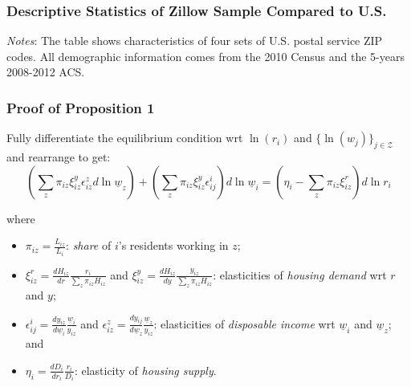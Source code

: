 

\begin{frame}[label = tab_comparison]
	\frametitle{Descriptive Statistics of Zillow Sample Compared to U.S.}
	
	\begin{table}[h!] \centering
		\resizebox{.72\textwidth}{!}{
			
		}
		\begin{minipage}{0.95\textwidth} \scriptsize \vspace{1mm}
			\textit{Notes}: The table shows characteristics of four sets of U.S. postal 
			service ZIP codes. All demographic information comes from the 2010 Census and 
			the 5-years 2008-2012 ACS.
		\end{minipage}
	\end{table}
	
	\hyperlink{zipcodes_map}{}
\end{frame}

\begin{frame}[label = proof_prop_1]
	\frametitle{Proof of Proposition 1}
	
	Fully differentiate the equilibrium condition wrt $\ln \left(r_i\right)$ and $
	\{\ln \left(w_j\right)\}_{j \in \mathcal{Z}}$ and rearrange to get:
	$$
	\left( \sum_z \pi_{i z} \xi_{i z}^y \epsilon_{i z}^z d \ln \underline{w}_z \right)
	+ \left( \sum_z \pi_{i z} \xi_{i z}^y \epsilon_{i j}^i \right) d \ln \underline{w}_i
	= \left(\eta_i - \sum_z \pi_{i z} \xi_{i z}^r \right) d \ln r_i
	$$
	
	where 
	\begin{itemize} \small
		\item $\pi_{iz} = \frac{L_{i z}}{L_i}$: \textit{share} of $i$'s residents 
		working in $z$;
		
		\item $\xi_{iz}^r = \frac{d H_{i z}}{d r} \frac{r_i}{\sum_z \pi_{i z}H_{i z}}$ 
		and $\xi_{iz}^y = \frac{d H_{i z}}{d y} \frac{y_{i z}}{\sum_z \pi_{i z}H_{i z}}$: 
		elasticities of \textit{housing demand} wrt $r$ and $y$;
		
		\item $\epsilon_{ij}^i = \frac{d y_{i z}}{d \underline{w}_i} 
		\frac{\underline{w}_i}{y_{i z}}$ and $\epsilon_{i z}^z = \frac{d y_{i j}}{d 
			\underline{w}_z} \frac{\underline{w}_z}{y_{i z}}$: elasticities of 
		\textit{disposable income} wrt $\underline{w}_i$ and $\underline{w}_z$; and
		
		\item $\eta_i = \frac{d D_i}{d r_i} \frac{r_i}{D_i}$: elasticity of 
		\textit{housing supply}.
	\end{itemize}
	
\end{frame}

